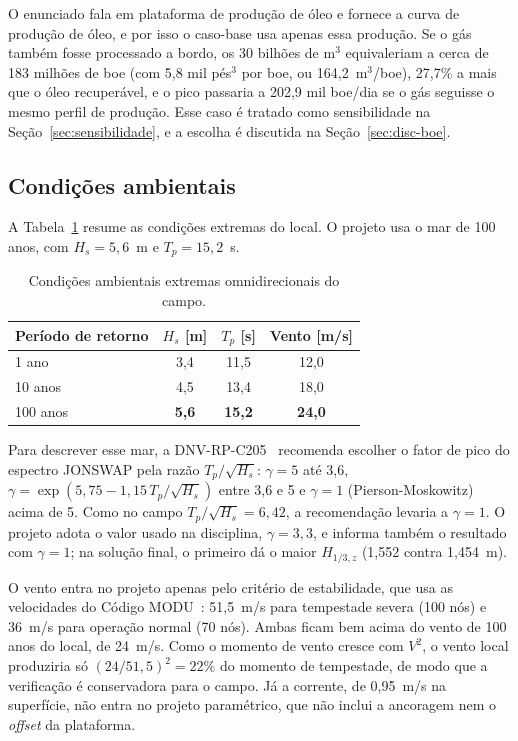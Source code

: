 \documentclass[11pt,a4paper]{article}
\newcommand{\Hz}{H_{1/3,z}}
\begin{document}
O enunciado fala em plataforma de produção de óleo e fornece a curva de produção de óleo, e por
isso o caso-base usa apenas essa produção. Se o gás também fosse processado a bordo, os 30
bilhões de m$^3$ equivaleriam a cerca de 183 milhões de boe (com 5,8 mil pés$^3$ por boe, ou
164,2~m$^3$/boe), 27,7\% a mais que o óleo recuperável, e o pico passaria a 202,9 mil boe/dia se o
gás seguisse o mesmo perfil de produção. Esse caso é tratado como sensibilidade na
Seção~\ref{sec:sensibilidade}, e a escolha é discutida na Seção~\ref{sec:disc-boe}.

\subsection{Condições ambientais}

A Tabela~\ref{tab:ambiente} resume as condições extremas do local. O projeto usa o mar de 100
anos, com $H_s = 5{,}6$~m e $T_p = 15{,}2$~s.

\begin{table}[!htb]
\centering
\caption{Condições ambientais extremas omnidirecionais do campo.}\label{tab:ambiente}
\begin{tabular}{lccc}
\toprule
Período de retorno & $H_s$ [m] & $T_p$ [s] & Vento [m/s] \\
\midrule
1 ano   & 3,4 & 11,5 & 12,0 \\
10 anos & 4,5 & 13,4 & 18,0 \\
100 anos & \textbf{5,6} & \textbf{15,2} & \textbf{24,0} \\
\bottomrule
\end{tabular}
\end{table}

Para descrever esse mar, a DNV-RP-C205~\cite{c205} recomenda escolher o fator de pico do espectro
JONSWAP pela razão $T_p/\sqrt{H_s}$: $\gamma = 5$ até 3,6, $\gamma = \exp(5{,}75 - 1{,}15\,
T_p/\sqrt{H_s})$ entre 3,6 e 5 e $\gamma = 1$ (Pierson-Moskowitz) acima de 5. Como no campo
$T_p/\sqrt{H_s} = 6{,}42$, a recomendação levaria a $\gamma = 1$. O projeto adota o valor usado na
disciplina, $\gamma = 3{,}3$, e informa também o resultado com $\gamma = 1$; na solução final, o
primeiro dá o maior $\Hz$ (1,552 contra 1,454~m).

O vento entra no projeto apenas pelo critério de estabilidade, que usa as velocidades do Código
MODU~\cite{modu}: 51,5~m/s para tempestade severa (100 nós) e 36~m/s para operação normal
(70 nós). Ambas ficam bem acima do vento de 100 anos do local, de 24~m/s. Como o momento de vento
cresce com $V^2$, o vento local produziria só $(24/51{,}5)^2 = 22\%$ do momento de tempestade, de
modo que a verificação é conservadora para o campo. Já a corrente, de 0,95~m/s na superfície, não
entra no projeto paramétrico, que não inclui a ancoragem nem o \emph{offset} da plataforma.
\end{document}
